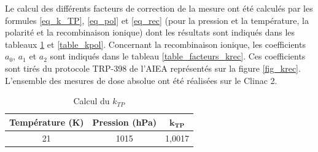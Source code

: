 \documentclass{article}
\begin{document}
Le calcul des différents facteurs de correction de la mesure ont été calculés par les formules \ref*{eq_k_TP}, \ref*{eq_pol} et \ref*{eq_rec} (pour la pression et la température, la polarité et la recombinaison ionique) dont les résultats sont indiqués dans les tableaux \ref*{table_ktp} et \ref*{table_kpol}. Concernant la recombinaison ionique, les coefficients $a_0$, $a_1$ et $a_2$ sont indiqués dans le tableau \ref*{table_facteurs_krec}. Ces coefficients sont tirés du protocole TRP-398 de l'AIEA \cite{international2001iaea} représentés sur la figure \ref*{fig_krec}. L'ensemble des mesures de dose absolue ont été réalisées sur le Clinac 2.

\begin{table}[h]
  \centering
  \begin{tabular}{ccc}
    \toprule
    \textbf{Température (K)} & \textbf{Pression (hPa)} & $\mathbf{k_{TP}}$ \\
    \toprule
    21 & 1015 & 1,0017 \\
    \bottomrule
  \end{tabular}
  \caption{Calcul du $k_{TP}$}
  \label{table_ktp}
\end{table}
\end{document}
